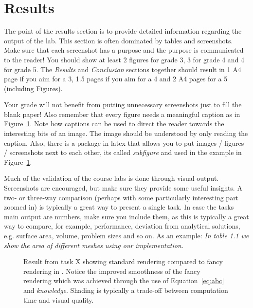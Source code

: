 \documentclass[twocolumn]{article}
\begin{document}
\section{Results}

The point of the results section is to provide detailed information regarding the output of the lab. This section is often dominated by tables and screenshots. Make sure that each screenshot has a purpose and the purpose is communicated to the reader! You should show at least 2 figures for grade 3, 3 for grade 4 and 4 for grade 5. The \emph{Results} and \emph{Conclusion} sections together should result in 1 A4 page if you aim for a 3, 1.5 pages if you aim for a 4 and 2 A4 pages for a 5 (including Figures).

Your grade will not benefit from putting unnecessary screenshots just to fill the blank paper! Also remember that every figure needs a meaningful caption as in Figure~\ref{fig:demo}. Note how captions can be used to direct the reader towards the interesting bits of an image. The image should be understood by only reading the caption. Also, there is a package in latex that allows you to put images / figures / screenshots next to each other, its called \emph{subfigure} and used in the example in Figure~\ref{fig:demo}.

Much of the validation of the course labs is done through visual output. Screenshots are encouraged, but make sure they provide some useful insights. A two- or three-way comparison (perhaps with some particularly interesting part zoomed in) is typically a great way to present a single task. In case the tasks main output are numbers, make sure you include them, as this is typically a great way to compare, for example, performance, deviation from analytical solutions, e.g. surface area, volume, problem sizes and so on. As an example: \emph{In table 1.1 we show the area of different meshes using our implementation.}

\begin{figure}[t]
\centering
    \caption{Result from task X showing  standard rendering compared to fancy rendering in . Notice the improved smoothness of the fancy rendering which was achieved through the use of Equation~\ref{eq:abc} and \emph{knowledge}. Shading is typically a trade-off between computation time and visual quality.}
    \label{fig:demo}
\end{figure}
\end{document}
